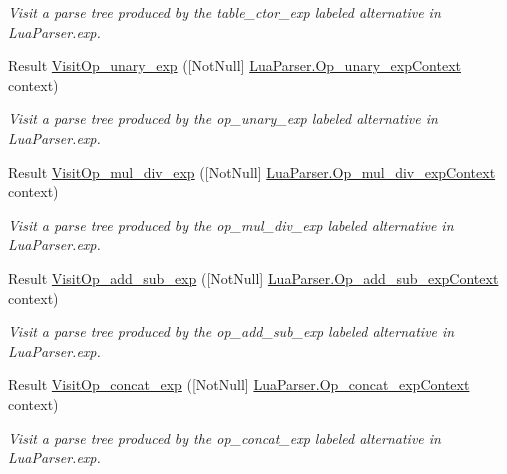 \begin{DoxyCompactItemize}
\begin{DoxyCompactList}\small\item\em Visit a parse tree produced by the {\ttfamily table\+\_\+ctor\+\_\+exp} labeled alternative in Lua\+Parser.\+exp. \end{DoxyCompactList}\item 
Result \mbox{\hyperlink{interfacezlua_1_1_i_lua_visitor_a492c5985ab1023b73ab337f585308f67}{Visit\+Op\+\_\+unary\+\_\+exp}} (\mbox{[}Not\+Null\mbox{]} \mbox{\hyperlink{classzlua_1_1_lua_parser_1_1_op__unary__exp_context}{Lua\+Parser.\+Op\+\_\+unary\+\_\+exp\+Context}} context)
\begin{DoxyCompactList}\small\item\em Visit a parse tree produced by the {\ttfamily op\+\_\+unary\+\_\+exp} labeled alternative in Lua\+Parser.\+exp. \end{DoxyCompactList}\item 
Result \mbox{\hyperlink{interfacezlua_1_1_i_lua_visitor_acfc0ee7f37ae465d9690dcba6fac5a60}{Visit\+Op\+\_\+mul\+\_\+div\+\_\+exp}} (\mbox{[}Not\+Null\mbox{]} \mbox{\hyperlink{classzlua_1_1_lua_parser_1_1_op__mul__div__exp_context}{Lua\+Parser.\+Op\+\_\+mul\+\_\+div\+\_\+exp\+Context}} context)
\begin{DoxyCompactList}\small\item\em Visit a parse tree produced by the {\ttfamily op\+\_\+mul\+\_\+div\+\_\+exp} labeled alternative in Lua\+Parser.\+exp. \end{DoxyCompactList}\item 
Result \mbox{\hyperlink{interfacezlua_1_1_i_lua_visitor_a07aadc305c06aa2b8c8c724a0262d998}{Visit\+Op\+\_\+add\+\_\+sub\+\_\+exp}} (\mbox{[}Not\+Null\mbox{]} \mbox{\hyperlink{classzlua_1_1_lua_parser_1_1_op__add__sub__exp_context}{Lua\+Parser.\+Op\+\_\+add\+\_\+sub\+\_\+exp\+Context}} context)
\begin{DoxyCompactList}\small\item\em Visit a parse tree produced by the {\ttfamily op\+\_\+add\+\_\+sub\+\_\+exp} labeled alternative in Lua\+Parser.\+exp. \end{DoxyCompactList}\item 
Result \mbox{\hyperlink{interfacezlua_1_1_i_lua_visitor_a5bb37038393d66e86ab98277a7df1f70}{Visit\+Op\+\_\+concat\+\_\+exp}} (\mbox{[}Not\+Null\mbox{]} \mbox{\hyperlink{classzlua_1_1_lua_parser_1_1_op__concat__exp_context}{Lua\+Parser.\+Op\+\_\+concat\+\_\+exp\+Context}} context)
\begin{DoxyCompactList}\small\item\em Visit a parse tree produced by the {\ttfamily op\+\_\+concat\+\_\+exp} labeled alternative in Lua\+Parser.\+exp. \end{DoxyCompactList}\item 

\end{DoxyCompactItemize}

